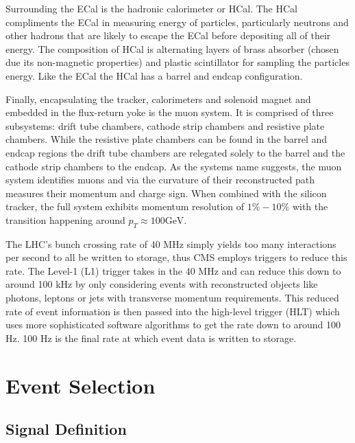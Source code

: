 \documentclass[a4paper,12pt]{article}
\begin{document}
    Surrounding the ECal is the hadronic calorimeter or HCal. The HCal
    compliments the ECal in measuring energy of particles, particularly neutrons
    and other hadrons that are likely to escape the ECal before depositing all
    of their energy. The composition of HCal is alternating layers of brass
    absorber (chosen due its non-magnetic properties) and plastic scintillator
    for sampling the particles energy. Like the ECal the HCal has a barrel and
    endcap configuration.

    Finally, encapsulating the tracker, calorimeters and solenoid magnet and
    embedded in the flux-return yoke is the muon system. It is comprised of
    three subsystems: drift tube chambers, cathode strip chambers and resistive
    plate chambers. While the resistive plate chambers can be found in the
    barrel and endcap regions the drift tube chambers are relegated solely to
    the barrel and the cathode strip chambers to the endcap. As the systems name
    suggests, the muon system identifies muons and via the curvature of their
    reconstructed path measures their momentum and charge sign. When combined
    with the silicon tracker, the full system exhibits momentum resolution of
    $1\% - 10\%$ with the transition happening around $p_T \approx 100
    \text{GeV}$.

    The LHC's bunch crossing rate of 40 MHz simply yields too many interactions
    per second to all be written to storage, thus CMS employs triggers to reduce
    this rate. The Level-1 (L1) trigger takes in the 40 MHz and can reduce this
    down to around 100 kHz by only considering events with reconstructed objects
    like photons, leptons or jets with transverse momentum requirements. This
    reduced rate of event information is then passed into the high-level trigger
    (HLT) which uses more sophisticated software algorithms to get the rate down
    to around 100 Hz. 100 Hz is the final rate at which event data is written
    to storage.

\section{Event Selection}

    \subsection{Signal Definition}
\end{document}
